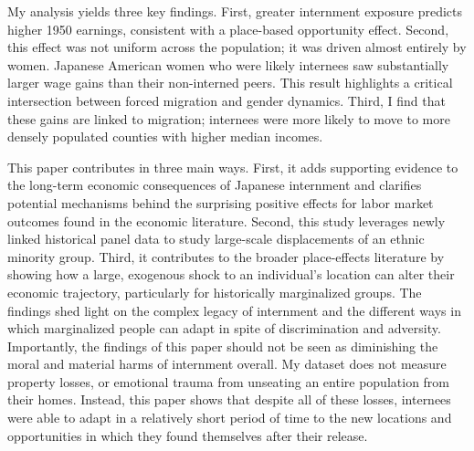 My analysis yields three key findings. 
First,
greater internment exposure predicts higher 1950 earnings,
consistent with a place-based opportunity effect.
Second, this effect was not uniform across the population; 
it was driven almost entirely by women. 
Japanese American women who were likely internees 
saw substantially larger wage gains than their non-interned peers.
This result highlights a critical intersection between forced migration 
and gender dynamics. 
Third, I find that these gains are linked to migration; 
internees were more likely to move to
more densely populated counties with higher median incomes.

This paper contributes in three main ways.
First, it adds supporting evidence to the long-term economic consequences 
of Japanese internment 
and clarifies potential mechanisms behind
the surprising positive effects for labor market outcomes
found in the economic literature.
Second, this study leverages newly linked historical panel data
to study large-scale displacements of an ethnic minority group.
Third, it contributes to the broader place-effects literature 
by showing how a large, exogenous shock to an individual's location 
can alter their economic trajectory, 
particularly for historically marginalized groups. 
The findings shed light on the complex legacy of internment 
and the different ways in which marginalized people can adapt
in spite of discrimination and adversity.
Importantly, the findings of this paper should not be seen
as diminishing the moral and material harms of internment overall.
My dataset does not measure property losses,
or emotional trauma from unseating an entire population from their homes.
Instead, this paper shows that despite all of these losses,
internees were able to adapt in a relatively short period of time
to the new locations and opportunities
in which they found themselves after their release.

